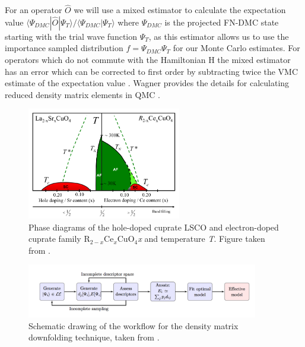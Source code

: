 \documentclass{article}
\begin{document}
For an operator $\hat{O}$ we will use a mixed estimator to calculate the expectation value $\langle \Psi_{DMC} |\hat{O} | \Psi_T \rangle/\langle \Psi_{DMC} | \Psi_T \rangle$ where $\Psi_{DMC}$ is the projected FN-DMC state starting with the trial wave function $\Psi_T$, as this estimator allows us to use the importance sampled distribution $f = \Psi_{DMC}\Psi_T$ for our Monte Carlo estimates.
For operators which do not commute with the Hamiltonian H the mixed estimator has an error which can be corrected to first order by subtracting twice the VMC estimate of the expectation value \cite{ceperley_kalos_1979}.
Wagner provides the details for calculating reduced density matrix elements in QMC \cite{doi:10.1063/1.4793531}.


\begin{figure}[H]
\centering
\includegraphics[width=0.6\textwidth]{Figures/I1-phase_diagram.png}
\caption{\label{fig1} Phase diagrams of the hole-doped cuprate LSCO and electron-doped cuprate family R$_{2-x}$Ce$_{x}$CuO$_4$\textit{x} and temperature \textit{T}. Figure taken from \cite{Armitage2010}. }
\end{figure}

\begin{figure}[H]
\centering
\includegraphics[width=0.9\textwidth]{Figures/I2-DMD_flow.png}
\caption{\label{fig2} Schematic drawing of the workflow for the density matrix downfolding technique, taken from \cite{10.3389/fphy.2018.00043}.}
\end{figure}
\end{document}
